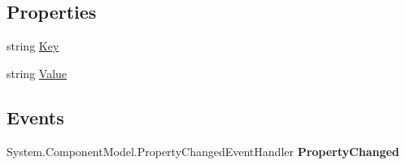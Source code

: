 \subsection*{Properties}
\begin{DoxyCompactItemize}
\item 
\hypertarget{class_price___comparison_1_1amazon_1_1ecs_1_1_cart_item_key_value_pair_af353bcc1b7c14b71f704b233fc7893d9}{string \hyperlink{class_price___comparison_1_1amazon_1_1ecs_1_1_cart_item_key_value_pair_af353bcc1b7c14b71f704b233fc7893d9}{Key}}\label{class_price___comparison_1_1amazon_1_1ecs_1_1_cart_item_key_value_pair_af353bcc1b7c14b71f704b233fc7893d9}

\begin{DoxyCompactList}\small\item\em \end{DoxyCompactList}\item 
\hypertarget{class_price___comparison_1_1amazon_1_1ecs_1_1_cart_item_key_value_pair_a066abff08406cae38696d5e3603168f7}{string \hyperlink{class_price___comparison_1_1amazon_1_1ecs_1_1_cart_item_key_value_pair_a066abff08406cae38696d5e3603168f7}{Value}}\label{class_price___comparison_1_1amazon_1_1ecs_1_1_cart_item_key_value_pair_a066abff08406cae38696d5e3603168f7}

\begin{DoxyCompactList}\small\item\em \end{DoxyCompactList}\end{DoxyCompactItemize}
\subsection*{Events}
\begin{DoxyCompactItemize}
\item 
\hypertarget{class_price___comparison_1_1amazon_1_1ecs_1_1_cart_item_key_value_pair_a2118e998f4262083d440b1d79d8a6d3c}{System.\-Component\-Model.\-Property\-Changed\-Event\-Handler {\bfseries Property\-Changed}}\label{class_price___comparison_1_1amazon_1_1ecs_1_1_cart_item_key_value_pair_a2118e998f4262083d440b1d79d8a6d3c}

\end{DoxyCompactItemize}
